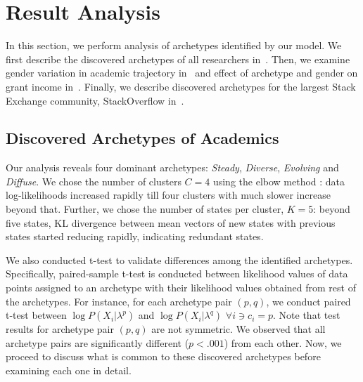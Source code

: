 \section{Result Analysis}
\label{sec:trajectory}
In this section, we perform analysis of archetypes identified by our model. We first describe the discovered archetypes of all researchers in~. Then, we examine gender variation in academic trajectory in~ and effect of archetype and gender on grant income in~. Finally, we describe discovered archetypes for the largest Stack Exchange community, StackOverflow in~.

\subsection{Discovered Archetypes of Academics}
\label{sec:acad}
Our analysis reveals four dominant archetypes: \emph{Steady}, \emph{Diverse}, \emph{Evolving} and \emph{Diffuse}. We chose the number of clusters $C=4$ using the elbow method \cite{elbow:2001}: data log-likelihoods increased rapidly till four clusters with much slower increase beyond that. Further, we chose the number of states per cluster, $K=5$: beyond five states, KL divergence\cite{kl:1951} between mean vectors of new states with previous states started reducing rapidly, indicating redundant states.

We also conducted t-test to validate differences among the identified archetypes. Specifically, paired-sample t-test \cite{goulden:1949} is conducted between likelihood values of data points assigned to an archetype with their likelihood values obtained from rest of the archetypes. For instance, for each archetype pair $(p, q)$, we conduct paired t-test between $\log P(X_i| \lambda^p)$ and $\log P(X_i| \lambda^q)$ $\forall i \ni c_i=p$. Note that test results for archetype pair $(p, q)$ are not symmetric.
We observed that all archetype pairs are significantly different ($p < .001$) from each other. Now, we proceed to discuss what is common to these discovered archetypes before examining each one in detail.

